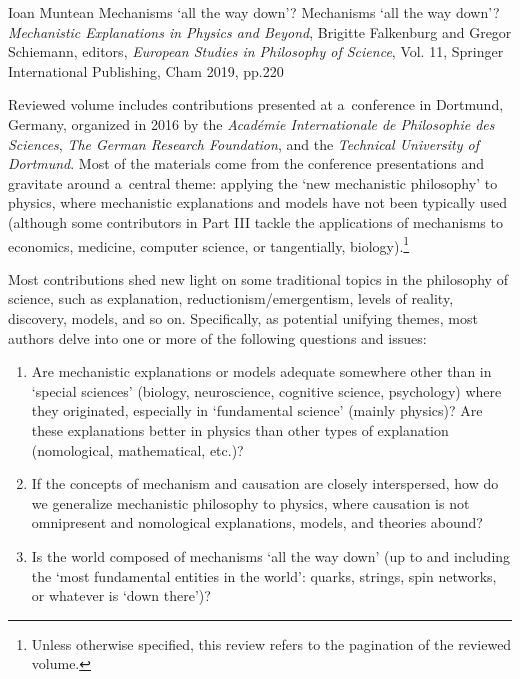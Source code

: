 \begin{recengenv}{Ioan Muntean}
	{Mechanisms ‘all the way down'?}
	{Mechanisms ‘all the way down'?}
	{\textit{Mechanistic Explanations in Physics and Beyond}, Brigitte Falkenburg and Gregor Schiemann, editors, \textit{European Studies in Philosophy of Science}, Vol. 11, Springer International Publishing, Cham 2019, pp.220}
	


\noindent Reviewed volume includes contributions presented at a~conference in Dortmund, Germany, organized in 2016 by the \textit{Académie Internationale de Philosophie des Sciences}, \textit{The German Research Foundation}, and the \textit{Technical University of Dortmund}. Most of the materials come from the conference presentations and gravitate around a~central theme: applying the ‘new mechanistic philosophy' to physics, where mechanistic explanations and models have not been typically used (although some contributors in Part III tackle the applications of mechanisms to economics, medicine, computer science, or tangentially, biology).\footnote{Unless otherwise specified, this review refers to the pagination of the reviewed
\parencite[][]{falkenburg_mechanistic_2019} %
 volume.}

Most contributions shed new light on some traditional topics in the philosophy of science, such as explanation, reductionism/emergentism, levels of reality, discovery, models, and so on. Specifically, as potential unifying themes, most authors delve into one or more of the following questions and issues:

\begin{enumerate}[label={(\arabic*)}]
\item Are mechanistic explanations or models adequate somewhere other than in ‘special sciences' (biology, neuroscience, cognitive science, psychology) where they originated, especially in ‘fundamental science' (mainly physics)? Are these explanations better in physics than other types of explanation (nomological, mathematical, etc.)?

\item If the concepts of mechanism and causation are closely interspersed, how do we generalize mechanistic philosophy to physics, where causation is not omnipresent and nomological explanations, models, and theories abound?

\item Is the world composed of mechanisms ‘all the way down' (up to and including the ‘most fundamental entities in the world': quarks, strings, spin networks, or whatever is ‘down there')?


\end{enumerate}
\end{recengenv}
